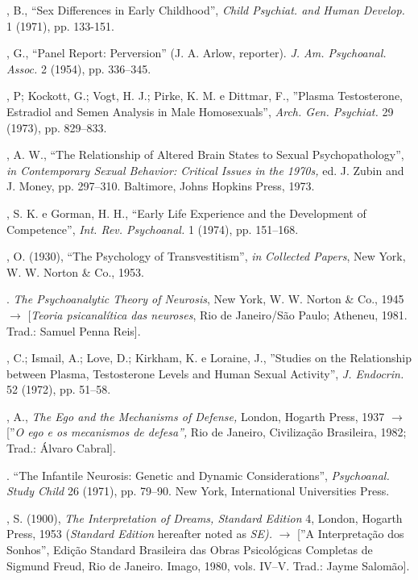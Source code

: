 \begin{description}
, B., ``Sex Differences in Early Childhood'',
\textit{Child Psychiat. and Human Develop. }1 (1971), pp. 133-151.

, G., ``Panel Report: Perversion'' (J. A.
Arlow, reporter). \textit{J. Am. Psychoanal. Assoc. } 2 (1954), pp. 336--345.

, P; Kockott, G.; Vogt, H. J.; Pirke, K. M. e Dittmar, F.,
''Plasma Testosterone, Estradiol and Semen Analysis in Male
Homosexuals'', \textit{Arch. Gen. Psychiat. }29 (1973), pp. 829--833.

, A. W., ``The Relationship of Altered Brain States to
Sexual Psychopathology'', \textit{in Contemporary Sexual Behavior:
Critical Issues in the 1970s, }ed. J. Zubin and J. Money, pp. 297--310. Baltimore,
Johns Hopkins Press, 1973.

, S. K. e Gorman, H. H., ``Early Life Experience and the
Development of Competence'', \textit{Int. Rev. Psychoanal. }1 (1974),
pp. 151--168.

, O. (1930), ``The Psychology of
Transvestitism'', \textit{in} \textit{Collected Papers}, New York, W.
W. Norton \& Co., 1953.

. \textit{ The Psychoanalytic Theory of Neurosis}, New York, W.
W. Norton \& Co., 1945 {$\bm{\rightarrow}$} [\textit{Teoria psicanalítica das neuroses}, Rio de
Janeiro/São Paulo; Atheneu, 1981. Trad.: Samuel Penna Reis].

, C.; Ismail, A.; Love, D.; Kirkham, K. e Loraine, J.,
''Studies on the Relationship between Plasma, Testosterone Levels and
Human Sexual Activity'', \textit{J. Endocrin. }52 (1972), pp. 51--58.

, A., \textit{The Ego and the Mechanisms of Defense, }London, Hogarth
Press, 1937 {$\bm{\rightarrow}$} [''\textit{O ego e os mecanismos de
defesa'', }Rio de Janeiro, Civilização Brasileira, 1982; Trad.:
Álvaro Cabral].

. ``The Infantile Neurosis: Genetic and Dynamic
Considerations'', \textit{Psychoanal. Study Child }26 (1971), pp.
79--90. New York, International Universities Press.

, S. (1900), \textit{The Interpretation of Dreams, Standard Edition }4,
London, Hogarth Press, 1953 (\textit{Standard Edition }hereafter noted as
\textit{SE). }{$\bm{\rightarrow}$} [''A Interpretação dos Sonhos'', Edição
Standard Brasileira das Obras Psicológicas Completas de Sigmund Freud, Rio de
Janeiro. Imago, 1980, vols. IV--V. Trad.: Jayme Salomão].


\end{description}
